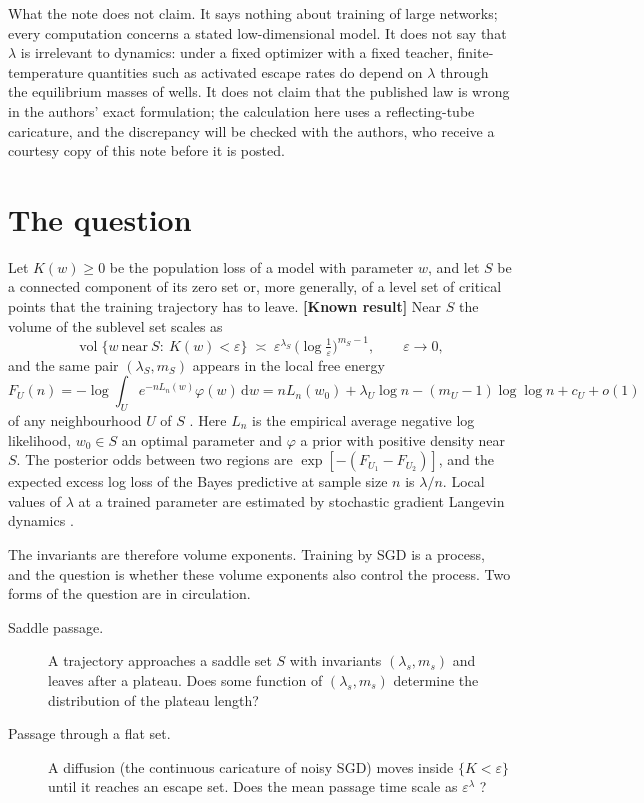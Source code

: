 \documentclass[11pt,a4paper]{article}
\newcommand{\eps}{\varepsilon}
\newcommand{\dd}{\mathrm d}
\newcommand{\evl}[2]{{\small\bfseries\color{#1}[#2]}}
\newcommand{\LKnown}{\evl{cknown}{Known result}}
\begin{document}
What the note does not claim. It says nothing about training of large
networks; every computation concerns a stated low-dimensional model. It does
not say that $\lambda$ is irrelevant to dynamics: under a fixed optimizer
with a fixed teacher, finite-temperature quantities such as activated escape
rates do depend on $\lambda$ through the equilibrium masses of wells. It
does not claim that the published law is wrong in the authors' exact
formulation; the calculation here uses a reflecting-tube caricature, and the
discrepancy will be checked with the authors, who receive a courtesy copy of
this note before it is posted.

\section{The question}
\label{sec:question}

Let $K(w)\ge0$ be the population loss of a model with parameter $w$, and let
$S$ be a connected component of its zero set or, more generally, of a level
set of critical points that the training trajectory has to leave. \LKnown{}
Near $S$ the volume of the sublevel set scales as
\begin{equation}
\operatorname{vol}\{w\ \text{near}\ S:\ K(w)<\eps\}\;\asymp\;
\eps^{\lambda_S}\,\bigl(\log\tfrac1\eps\bigr)^{m_S-1},\qquad \eps\to0,
\label{eq:volume}
\end{equation}
and the same pair $(\lambda_S,m_S)$ appears in the local free energy
\begin{equation}
F_U(n)=-\log\int_U e^{-nL_n(w)}\varphi(w)\,\dd w
= nL_n(w_0)+\lambda_U\log n-(m_U-1)\log\log n+c_U+o(1)
\label{eq:localF}
\end{equation}
of any neighbourhood $U$ of $S$ \cite{watanabe2009}. Here $L_n$ is the
empirical average negative log likelihood, $w_0\in S$ an optimal parameter
and $\varphi$ a prior with positive density near $S$. The posterior odds
between two regions are $\exp[-(F_{U_1}-F_{U_2})]$, and the expected excess
log loss of the Bayes predictive at sample size $n$ is $\lambda/n$. Local
values of $\lambda$ at a trained parameter are estimated by stochastic
gradient Langevin dynamics \cite{lau2025llc}.

The invariants are therefore volume exponents. Training by SGD is a
process, and the question is whether these volume exponents also control
the process. Two forms of the question are in circulation.

\begin{description}
\item[Saddle passage.] A trajectory approaches a saddle set $S$ with
invariants $(\lambda_s,m_s)$ and leaves after a plateau. Does some function
of $(\lambda_s,m_s)$ determine the distribution of the plateau length?
\item[Passage through a flat set.] A diffusion (the continuous caricature of
noisy SGD) moves inside $\{K<\eps\}$ until it reaches an escape set. Does
the mean passage time scale as $\eps^{\lambda}$ \cite{hennick2026}?
\end{description}
\end{document}
